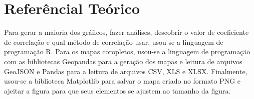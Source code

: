 \chapter{Referêncial Teórico}

Para gerar a maioria dos gráficos, fazer análises, descobrir o valor de coeficiente de correlação e qual método de correlação usar, usou-se a linguagem de programação R. Para os mapas coropletos, usou-se a linguagem de programação com as bibliotecas Geopandas para a geração dos mapas e leitura de arquivos GeoJSON e Pandas para a leitura de arquivos CSV, XLS e XLSX. Finalmente, usou-se a biblioteca  Matplotlib para salvar o mapa criado no formato PNG e ajeitar a figura para que seus elementos se ajustem ao tamanho da figura.